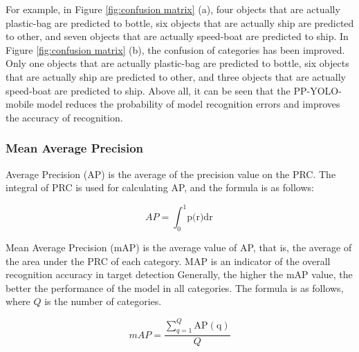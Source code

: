 \documentclass[sensors,article,submit,moreauthors,pdftex]{Definitions/mdpi}
\begin{document}
\begin{paracol}{2}
For example, in Figure \ref{fig:confusion matrix} (a), four objects that are actually plastic-bag are predicted to bottle, six objects that are actually ship are predicted to other, and seven objects that are actually speed-boat are predicted to ship. In Figure \ref{fig:confusion matrix} (b), the confusion of categories has been improved. Only one objects that are actually plastic-bag are predicted to bottle, six objects that are actually ship are predicted to other, and three objects that are actually speed-boat are predicted to ship. Above all, it can be seen that the PP-YOLO-mobile model reduces the probability of model recognition errors and improves the accuracy of recognition.





\subsubsection{Mean Average Precision}
Average Precision (AP) is the average of the precision value on the PRC. The integral of PRC is used for calculating AP, and the formula is as follows:

\begin{equation} 
{AP} = {\int_{0}^{1}\text{p(r)dr}} 
\end{equation}

Mean Average Precision (mAP) is the average value of AP, that is, the average of the area under the PRC of each category. MAP is an indicator of the overall recognition accuracy in target detection Generally, the higher the mAP value, the better the performance of the model in all categories. The formula is as follows, where $Q$ is the number of categories.

\begin{equation} 
{mAP} = {\frac {\sum _{q=1}^{Q}\operatorname {AP(q)} }{Q}}
\end{equation}


\end{paracol}
\end{document}
